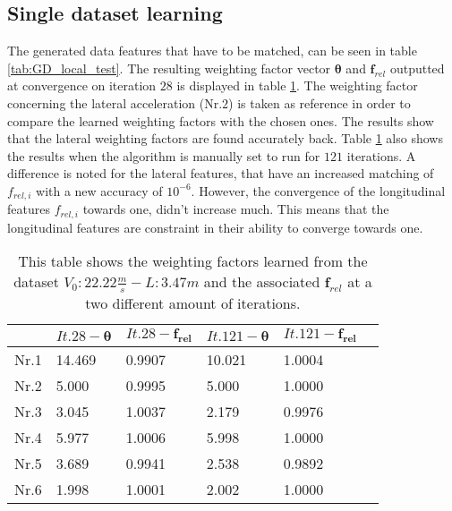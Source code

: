 \subsection{Single dataset learning}\label{s:SDL}
The generated data features that have to be matched, can be seen in table \ref{tab:GD_local_test}.
The resulting weighting factor vector $\bm{\theta}$ and $\bm{f}_{rel}$ outputted at convergence on iteration $28$ is displayed in table \ref{tab:comp_it}. The weighting factor concerning the lateral acceleration (Nr.$2$) is taken as reference in order to compare the learned weighting factors with the chosen ones. The results show that the lateral weighting factors are found accurately back. Table \ref{tab:comp_it} also shows the results when the algorithm is manually set to run for $121$ iterations.
A difference is noted for the lateral features, that have an increased matching of $f_{rel,i}$ with a new accuracy of $10^{-6}$. However, the convergence of the longitudinal features $f_{rel,i}$ towards one, didn't increase much. This means that the longitudinal features are constraint in their ability to converge towards one.

\begin{table}[h!]
	\centering
	\begin{tabular}{@{}llllll} \toprule
					      & $It.28-\bm{\theta}$ & $It.28-\bm{f_{rel}}$ & $It.121- \bm{\theta}$ & $It.121-\bm{f_{rel}}$\\ \midrule
		Nr.1       		  &14.469        & 0.9907 	    & 10.021 &	1.0004	\\
		Nr.2              &5.000       & 0.9995       & 5.000 &   1.0000   \\
		Nr.3              & 3.045       & 1.0037       & 2.179 &  0.9976    \\
		Nr.4              & 5.977       & 1.0006       & 5.998 & 1.0000     \\
		Nr.5              & 3.689       & 0.9941       & 2.538 &   0.9892   \\
		Nr.6              & 1.998       & 1.0001       & 2.002 &  1.0000    \\ \bottomrule
	\end{tabular}
	\caption{This table shows the weighting factors learned from the dataset $V_0:22.22\frac{m}{s}-L:3.47m$ and the associated $\bm{f}_{rel}$ at a two different amount of iterations.}
	\label{tab:comp_it}
\end{table} 

